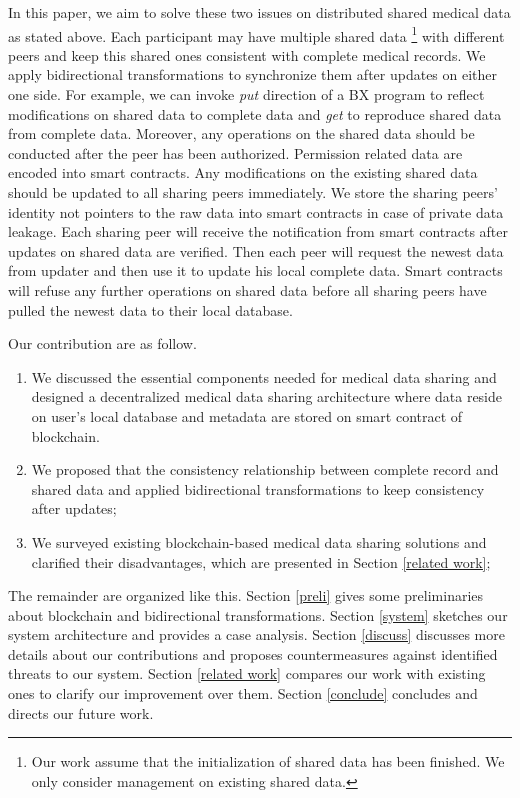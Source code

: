 \documentclass[conference]{IEEEtran}
\begin{document}
In this paper, we aim to solve these two issues on distributed shared medical data as stated above. 
Each participant may have multiple shared data \footnote{Our work assume that the initialization of shared data has been finished. We only consider management on existing shared data.} with different peers and keep this shared ones consistent with complete medical records. We apply bidirectional transformations \cite{hu2014validity} to synchronize them after updates on either one side. For example, we can invoke \emph{put} direction of a  BX program to reflect modifications on shared data to complete data and \emph{get} to reproduce shared data from complete data. 
Moreover,  any operations on the shared data should be conducted after the peer has been authorized. Permission related data are encoded into smart contracts. Any modifications on the existing shared data should be updated to all sharing peers immediately. We store the sharing peers' identity not pointers to the raw data into smart contracts in case of private data leakage. Each sharing peer will receive the notification from smart contracts after updates on shared data are verified. Then each peer will request the newest data from updater and then use it to update his local complete data. Smart contracts will refuse any further operations on shared data before all sharing peers have pulled the newest data to their local database.

Our contribution are as follow.
\begin{enumerate}
	\item We discussed the essential components needed for medical data sharing and designed  a decentralized medical data sharing architecture where data reside on user's local database and metadata are stored on smart contract of  blockchain. 
	\item We proposed that the consistency relationship between complete record and shared data and applied bidirectional transformations to keep consistency after updates;
	\item We surveyed existing blockchain-based medical data sharing solutions and clarified their disadvantages, which are presented in Section \ref{related work};
\end{enumerate}

The remainder are organized like this. Section \ref{preli} gives some preliminaries about blockchain and bidirectional transformations. Section \ref{system} sketches our system architecture and provides a case analysis. Section \ref{discuss} discusses more details about our contributions and proposes countermeasures against identified threats to our system. Section \ref{related work} compares our work with existing ones to clarify our improvement over them. Section \ref{conclude} concludes and directs our future work.
\end{document}

